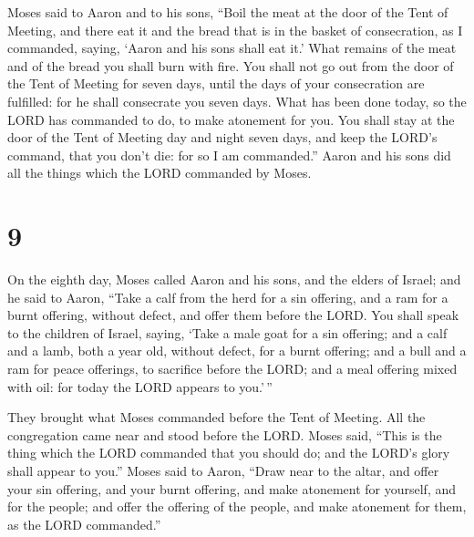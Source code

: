  Moses said to Aaron and to his sons, ``Boil the meat at
the door of the Tent of Meeting, and there eat it and the bread that is
in the basket of consecration, as I commanded, saying, `Aaron and his
sons shall eat it.'  What remains of the meat and of the
bread you shall burn with fire.  You shall not go out
from the door of the Tent of Meeting for seven days, until the days of
your consecration are fulfilled: for he shall consecrate you seven days.
 What has been done today, so the LORD has commanded to
do, to make atonement for you.  You shall stay at the
door of the Tent of Meeting day and night seven days, and keep the
LORD's command, that you don't die: for so I am commanded.''
 Aaron and his sons did all the things which the LORD
commanded by Moses.

\hypertarget{section-8}{%
\section{9}\label{section-8}}

 On the eighth day, Moses called Aaron and his sons, and
the elders of Israel;  and he said to Aaron, ``Take a calf
from the herd for a sin offering, and a ram for a burnt offering,
without defect, and offer them before the LORD.  You shall
speak to the children of Israel, saying, `Take a male goat for a sin
offering; and a calf and a lamb, both a year old, without defect, for a
burnt offering;  and a bull and a ram for peace offerings,
to sacrifice before the LORD; and a meal offering mixed with oil: for
today the LORD appears to you.'\,''

 They brought what Moses commanded before the Tent of
Meeting. All the congregation came near and stood before the LORD.
 Moses said, ``This is the thing which the LORD commanded
that you should do; and the LORD's glory shall appear to you.''
 Moses said to Aaron, ``Draw near to the altar, and offer
your sin offering, and your burnt offering, and make atonement for
yourself, and for the people; and offer the offering of the people, and
make atonement for them, as the LORD commanded.''

